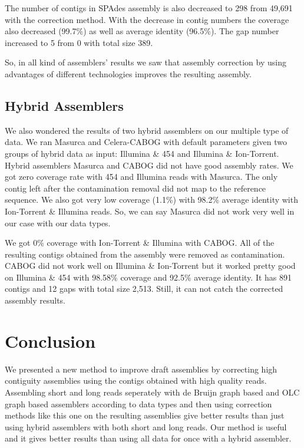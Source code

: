 \documentclass{llncs}
\begin{document}
The number of contigs in SPAdes assembly is also decreased to 298 from 49,691 with the correction method. With the decrease in contig numbers the coverage also decreased (99.7\%) as well as average identity (96.5\%). The gap number increased to 5 from 0 with total size 389.

So, in all kind of assemblers' results we saw that assembly correction by using advantages of different technologies improves the resulting assembly.

\subsection{Hybrid Assemblers}

We also wondered the results of two hybrid assemblers on our multiple type of data. We ran Masurca and Celera-CABOG with default parameters given two groups of hybrid data as input: Illumina \& 454 and Illumina \& Ion-Torrent. Hybrid assemblers Masurca and CABOG did not have good assembly rates. We got zero coverage rate with 454 and Illumina reads with Masurca. The only contig left after the contamination removal did not map to the reference sequence. We also got very low coverage (1.1\%) with 98.2\% average identity  with Ion-Torrent \& Illumina reads. So, we can say Masurca did not work very well in our case with our data types. 

We got 0\% coverage with Ion-Torrent \& Illumina with CABOG. All of the resulting contigs obtained from the assembly were removed as contamination. CABOG did not work well on Illumina \& Ion-Torrent but it worked pretty good on Illumina \& 454 with 98.58\% coverage and 92.5\% average identity. It has 891 contigs and 12 gaps with total size 2,513. Still, it can not catch the corrected assembly results.

\section{Conclusion}

We presented a new method to improve draft assemblies by correcting high contiguity assemblies using the contigs obtained with high quality reads. Assembling short and long reads seperately with de Bruijn graph based and OLC graph based assemblers according to data types and then using correction methods like this one on the resulting assemblies give better results than just using hybrid assemblers with both short and long reads. Our method is useful and it gives better results than using all data for once with a hybrid assembler. 
\end{document}
